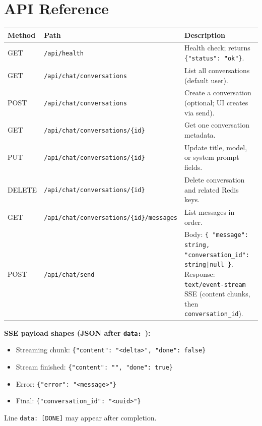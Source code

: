 \documentclass[11pt,a4paper]{article}
\begin{document}
\section{API Reference}

\begin{longtable}{@{}llp{6.8cm}@{}}
\toprule
\textbf{Method} & \textbf{Path} & \textbf{Description} \\
\midrule
\endhead
GET & \texttt{/api/health} & Health check; returns \texttt{\{"status": "ok"\}}. \\
GET & \texttt{/api/chat/conversations} & List all conversations (default user). \\
POST & \texttt{/api/chat/conversations} & Create a conversation (optional; UI creates via send). \\
GET & \texttt{/api/chat/conversations/\{id\}} & Get one conversation metadata. \\
PUT & \texttt{/api/chat/conversations/\{id\}} & Update title, model, or system prompt fields. \\
DELETE & \texttt{/api/chat/conversations/\{id\}} & Delete conversation and related Redis keys. \\
GET & \texttt{/api/chat/conversations/\{id\}/messages} & List messages in order. \\
POST & \texttt{/api/chat/send} & Body: \texttt{\{ "message": string, "conversation\_id": string|null \}}. Response: \texttt{text/event-stream} SSE (content chunks, then \texttt{conversation\_id}). \\
\bottomrule
\end{longtable}

\noindent\textbf{SSE payload shapes (JSON after \texttt{data: }):}
\begin{itemize}[noitemsep]
  \item Streaming chunk: \texttt{\{"content": "<delta>", "done": false\}}
  \item Stream finished: \texttt{\{"content": "", "done": true\}}
  \item Error: \texttt{\{"error": "<message>"\}}
  \item Final: \texttt{\{"conversation\_id": "<uuid>"\}}
\end{itemize}
Line \texttt{data: [DONE]} may appear after completion.
\end{document}
